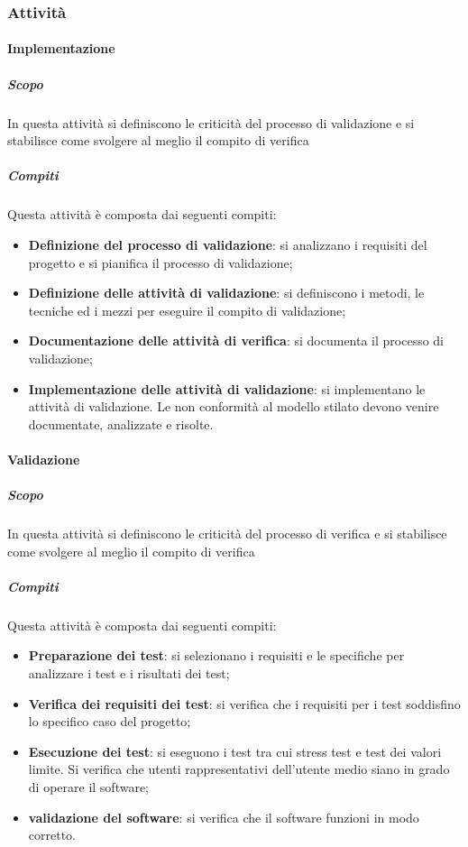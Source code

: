 \subsubsection{Attività}

\paragraph{Implementazione}
\label{par:Implementazione}
\subparagraph{Scopo}
\label{par:Implementazione:scopo}
In questa attività si definiscono le criticità del processo di validazione e si stabilisce come svolgere al meglio il compito di verifica\\
\subparagraph{Compiti}
\label{par:Implementazione:compiti}
Questa attività è composta dai seguenti compiti:
\begin{itemize}
    \item \textbf{Definizione del processo di validazione}: si analizzano i requisiti del progetto e si pianifica il processo di validazione;
    \item \textbf{Definizione delle attività di validazione}: si definiscono i metodi, le tecniche ed i mezzi per eseguire il compito di validazione;
    \item \textbf{Documentazione delle attività di verifica}: si documenta il processo di validazione;
    \item \textbf{Implementazione delle attività di validazione}: si implementano le attività di validazione. Le non conformità al modello stilato devono venire documentate, analizzate e risolte.
\end{itemize}

\paragraph{Validazione}
\label{par:validazione}
\subparagraph{Scopo}
\label{par:validazione:scopo}
In questa attività si definiscono le criticità del processo di verifica e si stabilisce come svolgere al meglio il compito di verifica\\
\subparagraph{Compiti}
\label{par:validazione:compiti}
Questa attività è composta dai seguenti compiti:
\begin{itemize}
    \item \textbf{Preparazione dei test}: si selezionano i requisiti e le specifiche per analizzare i test e i risultati dei test;
    \item \textbf{Verifica dei requisiti dei test}: si verifica che i requisiti per i test soddisfino lo specifico caso del progetto;
    \item \textbf{Esecuzione dei test}: si eseguono i test tra cui stress test e test dei valori limite. Si verifica che utenti rappresentativi dell'utente medio siano in grado di operare il software;
    \item \textbf{validazione del software}: si verifica che il software funzioni in modo corretto.
\end{itemize}

